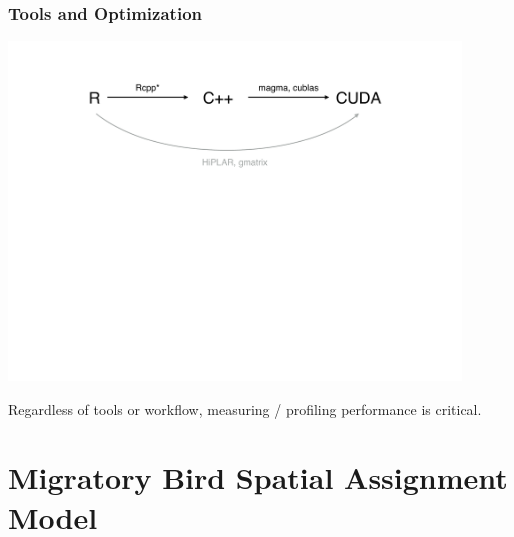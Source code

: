 \documentclass[t]{beamer}\usepackage[]{graphicx}\usepackage[]{color}
\begin{document}

\begin{frame}
\frametitle{Tools and Optimization}

\vfill

\begin{center}
\includegraphics[width=0.9\textwidth]{figs/diagram.pdf}
\end{center}

\vfill

Regardless of tools or workflow, measuring / profiling performance is critical.

\vfill

\end{frame}


\section{Migratory Bird Spatial Assignment Model}

\end{document}
